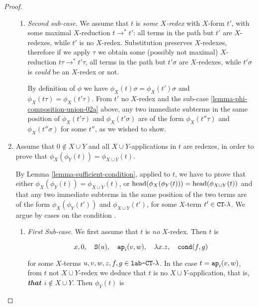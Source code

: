 \begin{proof}
\begin{enumerate}
\begin{enumerate}
\item
\label{lemma-phi-composition-union-02b}
\emph{Second sub-case}.
We assume that $t$ is \emph{some $X$-redex} with $X$-form $t'$, with some maximal $X$-reduction
$t \rightarrow^* t'$: all terms in the path but $t'$ are $X$-redexes, while $t'$ is no $X$-redex. 
Substitution preserves $X$-redexes, therefore if we apply $\tau$ we obtain some  
(possibly not maximal) $X$-reduction $t\tau \rightarrow^* t'\tau$, 
all terms in the path but $t'\sigma$ are $X$-redexes, while 
$t'\sigma$ is \emph{could} be an $X$-redex or not.

By definition of $\phi$ we have $\phi_X(t)\sigma = \phi_X(t')\sigma$ 
and $\phi_X(t\tau) = \phi_X(t'\tau)$.
From $t'$ no $X$-redex and the sub-case \ref{lemma-phi-composition-union-02a} above, 
any two immediate subterms in the same position of $\phi_X(t'\tau)$ and $\phi_X(t'\sigma)$
are of the form $\phi_X(t''\tau)$ and $\phi_X(t''\sigma)$ for some $t''$,
as we wished to show.

\end{enumerate}


\item
Assume that $0 \not \in X \cup Y$ and all $X \cup Y$-applications in $t$ are redexes, 
in order to prove that $\phi_{X}(\phi_{Y}(t)) = \phi_{X \cup Y}(t)$.

By Lemma \ref{lemma-sufficient-condition}, applied to $t$, we have to prove that
either $\phi_{X}(\phi_{Y}(t)) = \phi_{X \cup Y}(t)$, or
${\rm head}( \phi_{X}(\phi_{Y}(t)) ) = {\rm head}( \phi_{X \cup Y}(t) )$ 
and that any two immediate subterms in the same position of the two terms 
are of the form $\phi_{X}(\phi_{Y}(t')) $ and $\phi_{X \cup Y}(t')$, 
for some $X$-term $t' \in { {\tt CT}\mbox{-}\lambda}$.
We argue by cases on the condition \emph{}.

\begin{enumerate}
\item
\label{lemma-phi-composition-union-03a}
\emph{First Sub-case}.
We first assume that $t$ is \emph{no} $X$-redex. Then $t$ is

$$ 
x, 
0, \ \ \  
{\tt S}(u),  \ \ \  
{\tt ap}_i(v,w), \ \ \  
\lambda x.z, \ \ \  
{\tt cond}(f,g)
$$

for some $X$-terms $u,v,w,z,f,g \in {\mbox{\tt lab-} { {\tt CT}\mbox{-}\lambda} }$. 
In the case $t = {\tt ap}_i(v,w)$, from $t$ not $X \cup Y$-redex we deduce that $t$ is no
$X \cup Y$-application, that is, \emph{\bf that $i \not \in X \cup Y$}. 
Then $\phi_{Y}(t)$ is


\end{enumerate}
\end{enumerate}
\end{proof}
